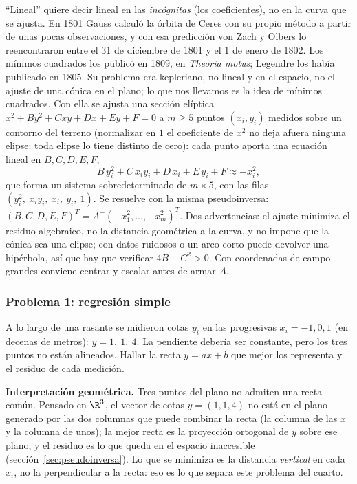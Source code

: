 \begin{resultado}
``Lineal'' quiere decir lineal en las \emph{incógnitas} (los coeficientes), no en la curva
que se ajusta. En 1801 Gauss calculó la órbita de Ceres con su propio método a partir de
unas pocas observaciones, y con esa predicción von Zach y Olbers lo reencontraron entre el
31 de diciembre de 1801 y el 1 de enero de 1802. Los mínimos cuadrados los publicó en 1809,
en \emph{Theoria motus}; Legendre los había publicado en 1805. Su problema era kepleriano,
no lineal y en el espacio, no el ajuste de una cónica en el plano; lo que nos llevamos es
la idea de mínimos cuadrados. Con ella se ajusta una sección elíptica
\(x^2+By^2+Cxy+Dx+Ey+F=0\) a \(m\ge5\) puntos \((x_i,y_i)\) medidos sobre un contorno
del terreno (normalizar en \(1\) el coeficiente de \(x^2\) no deja afuera ninguna elipse:
toda elipse lo tiene distinto de cero): cada punto aporta una ecuación lineal en \(B,C,D,E,F\),
\[
  B\,y_i^2+C\,x_iy_i+D\,x_i+E\,y_i+F\approx-x_i^2 ,
\]
que forma un sistema sobredeterminado de \(m\times5\), con las filas
\((y_i^2,\ x_iy_i,\ x_i,\ y_i,\ 1)\). Se resuelve con la misma pseudoinversa:
\((B,C,D,E,F)^T=A^{+}(-x_1^2,\dots,-x_m^2)^T\). Dos advertencias: el ajuste minimiza
el residuo algebraico, no la distancia geométrica a la curva, y no impone que la cónica sea
una elipse; con datos ruidosos o un arco corto puede devolver una hipérbola, así que hay
que verificar \(4B-C^2>0\). Con coordenadas de campo grandes conviene centrar y escalar
antes de armar \(A\).
\end{resultado}

\subsubsection{Problema 1: regresión simple}

\begin{enunciado}[Enunciado]
A lo largo de una rasante se midieron cotas \(y_i\) en las progresivas \(x_i=-1,0,1\)
(en decenas de metros): \(y=1,\ 1,\ 4\). La pendiente debería ser constante, pero los tres
puntos no están alineados. Hallar la recta \(y=ax+b\) que mejor los representa y el
residuo de cada medición.
\end{enunciado}

\textbf{Interpretación geométrica.} Tres puntos del plano no admiten una recta común.
Pensado en \(\R^3\), el vector de cotas \(y=(1,1,4)\) no está en el plano generado por
las dos columnas que puede combinar la recta (la columna de las \(x\) y la columna de
unos); la mejor recta es la proyección ortogonal de \(y\) sobre ese plano, y el residuo
es lo que queda en el espacio inaccesible (sección~\ref{sec:pseudoinversa}). Lo que se
minimiza es la distancia \emph{vertical} en cada \(x_i\), no la perpendicular a la
recta: eso es lo que separa este problema del cuarto.


